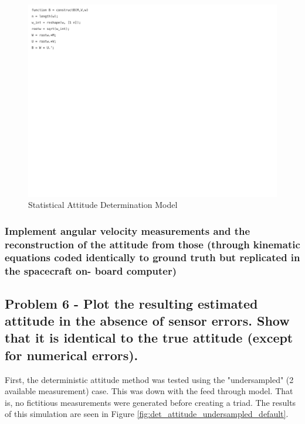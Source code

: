 \begin{figure}[H]
    \centering
    \captionsetup{ justification = centering }
    \includegraphics[trim={0cm 15cm 10cm 0cm},clip,width = 15cm]{Images/PS6/statisticalAttitude-3.png}
    \caption{Statistical Attitude Determination Model}
    \label{fig:stat_attitude}
\end{figure}

\subsubsection{Implement angular velocity measurements and the reconstruction of the attitude from those (through kinematic equations coded identically to ground truth but replicated in the spacecraft on- board computer)}

\subsection{Problem 6 - Plot the resulting estimated attitude in the absence of sensor errors. Show that it is identical to the true attitude (except for numerical errors).}

First, the deterministic attitude method was tested using the "undersampled" (2 available measurement) case. This was down with the feed through model. That is, no fictitious measurements were generated before creating a triad. The results of this simulation are seen in Figure \ref{fig:det_attitude_undersampled_default}.

